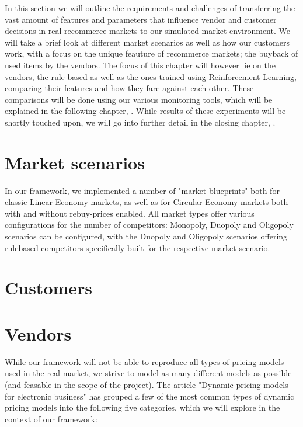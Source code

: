 \begin{jointwork}
	In this section we will outline the requirements and challenges of transferring the vast amount of features and parameters that influence vendor and customer decisions in real recommerce markets to our simulated market environment. We will take a brief look at different market scenarios  as well as how our customers work, with a focus on the unique feauture of recommerce markets; the buyback of used items by the vendors. The focus of this chapter will however lie on the vendors, the rule based as well as the ones trained using Reinforcement Learning, comparing their features and how they fare against each other. These comparisons will be done using our various monitoring tools, which will be explained in the following chapter, . While results of these experiments will be shortly touched upon, we will go into further detail in the closing chapter, .
\end{jointwork}

\section{Market scenarios} \label{section:MarketScenarios}

In our framework, we implemented a number of "market blueprints" both for classic Linear Economy markets, as well as for Circular Economy markets both with and without rebuy-prices enabled. All market types offer various configurations for the number of competitors: Monopoly, Duopoly and Oligopoly scenarios can be configured, with the Duopoly and Oligopoly scenarios offering rulebased competitors specifically built for the respective market scenario. 

\section{Customers}
\section{Vendors} \label{section:ExplainVendors}

While our framework will not be able to reproduce all types of pricing models used in the real market, we strive to model as many different models as possible (and feasable in the scope of the project). The article "Dynamic pricing models for electronic business" \cite{dynamicPricingModels} has grouped a few of the most common types of dynamic pricing models into the following five categories, which we will explore in the context of our framework:

